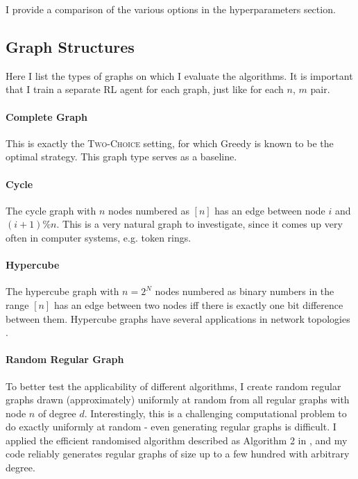 I provide a comparison of the various options in the hyperparameters section.


\subsection{Graph Structures}


Here I list the types of graphs on which I evaluate the algorithms. It is important that I train a separate RL agent for each graph, just like for each $n$, $m$ pair.


\paragraph{Complete Graph} This is exactly the \textsc{Two-Choice} setting, for which Greedy is known to be the optimal strategy. This graph type serves as a baseline.


\paragraph{Cycle} The cycle graph with $n$ nodes numbered as $[n]$ has an edge between node $i$ and $(i+1)\%n$. This is a very natural graph to investigate, since it comes up very often in computer systems, e.g. token rings.


\paragraph{Hypercube} The hypercube graph with $n=2^N$ nodes numbered as binary numbers in the range $[n]$ has an edge between two nodes iff there is exactly one bit difference between them. Hypercube graphs have several applications in network topologies \cite{ostrouchov1987hypercubenetwork} .


\paragraph{Random Regular Graph} To better test the applicability of different algorithms, I create random regular graphs drawn (approximately) uniformly at random from all regular graphs with node $n$ of degree $d$. Interestingly, this is a challenging computational problem to do exactly uniformly at random - even generating regular graphs is difficult. I applied the efficient randomised algorithm described as Algorithm 2 in \cite{steger1999randomregulargraphs}, and my code reliably generates regular graphs of size up to a few hundred with arbitrary degree.



